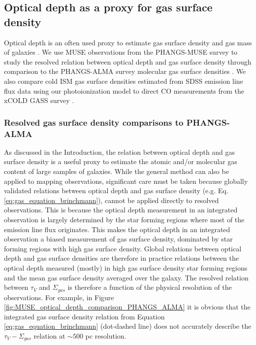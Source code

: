 \documentclass[fleqn,usenatbib]{mnras}
\begin{document}
\subsection{Optical depth as a proxy for gas surface density}
\label{sec:gas_surface_density}
Optical depth is an often used proxy to estimate gas surface density and gas mass of galaxies \citep[e.g.][]{guver2009, heiderman2010, brinchmann2013, concas2019}. We use MUSE observations from the PHANGS-MUSE survey \citep{emsellem2021} to study the resolved relation between optical depth and gas surface density through comparison to the PHANGS-ALMA survey molecular gas surface densities \citep{leroy2021}. We also compare cold ISM gas surface densities estimated from SDSS emission line flux data using our photoionization model to direct CO measurements from the xCOLD GASS survey \citep{saintonge2017}.

\subsubsection{Resolved gas surface density comparisons to PHANGS-ALMA}
As discussed in the Introduction, the relation between optical depth and gas surface density is a useful proxy to estimate the atomic and/or molecular gas content of large samples of galaxies. While the general method can also be applied to mapping  observations, significant care must be taken because globally validated relations between optical depth and gas surface density (e.g.  Eq. \ref{eq:gas_equation_brinchmann}), cannot be applied directly to resolved observations. This is because the optical depth measurement in an integrated observation is largely determined by the star forming regions where most of the emission line flux originates. This makes the optical depth in an integrated observation a biased measurement of gas surface density, dominated by star forming regions with high gas surface density. Global relations between optical depth and gas surface densities are therefore in practice relations between the optical depth measured (mostly) in high gas surface density star forming regions and the mean gas surface density averaged over the galaxy. The resolved relation between $\tau_V$ and $\Sigma_{gas}$ is therefore a function of the physical resolution of the observations. For example, in Figure \ref{fig:MUSE_optical_depth_comparison_PHANGS_ALMA} it is obvious that the integrated gas surface density relation from Equation \ref{eq:gas_equation_brinchmann} (dot-dashed line) does not accurately describe the $\tau_V-\Sigma_{gas}$ relation at $\sim500$ pc resolution. 
\end{document}
